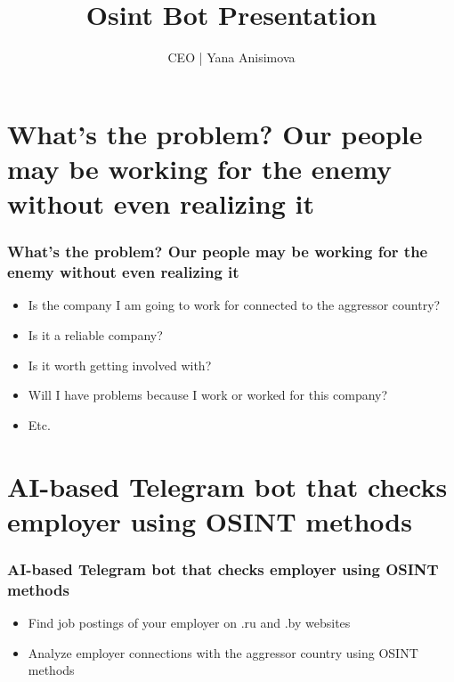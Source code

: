 \documentclass{beamer}
\title{Osint Bot Presentation}
\author{CEO | Yana Anisimova}
\begin{document}
\frame{\titlepage}

\section{What's the problem? Our people may be working for the enemy without even realizing it}

\begin{frame}
  \frametitle{\small What's the problem? Our people may be working for the enemy without even realizing it}
  \sloppy  %
  \begin{itemize}
    \item Is the company I am going to work for connected to the aggressor country?
    \item Is it a reliable company?
    \item Is it worth getting involved with?
    \item Will I have problems because I work or worked for this company?
    \item Etc.
  \end{itemize}
\end{frame}

\section{AI-based Telegram bot that checks employer using OSINT methods}

\begin{frame}
  \frametitle{\small AI-based Telegram bot that checks employer using OSINT methods}
  \begin{itemize}
    \item Find job postings of your employer on .ru and .by websites
    \item Analyze employer connections with the aggressor country using OSINT methods
  \end{itemize}
  
  \begin{center}
  \end{center}
\end{frame}
\end{document}
